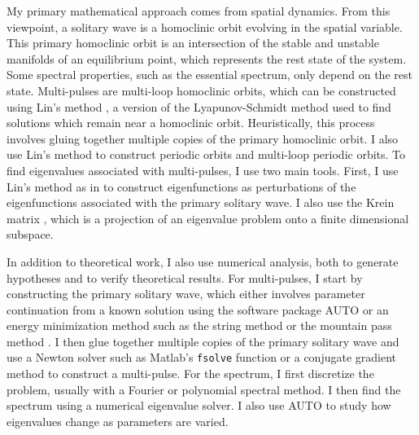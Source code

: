 \documentclass[12pt,reqno,oneside]{article}
\theoremstyle{definition}
\theoremstyle{remark}
\begin{document}
My primary mathematical approach comes from spatial dynamics. From this viewpoint, a solitary wave is a homoclinic orbit evolving in the spatial variable. This primary homoclinic orbit is an intersection of the stable and unstable manifolds of an equilibrium point, which represents the rest state of the system. Some spectral properties, such as the essential spectrum, only depend on the rest state. Multi-pulses are multi-loop homoclinic orbits, which can be constructed using Lin's method \cite{Lin2008}, a version of the Lyapunov-Schmidt method used to find solutions which remain near a homoclinic orbit. Heuristically, this process involves gluing together multiple copies of the primary homoclinic orbit. I also use Lin's method to construct periodic orbits and multi-loop periodic orbits. To find eigenvalues associated with multi-pulses, I use two main tools. First, I use Lin's method as in \cite{Sandstede1998} to construct eigenfunctions as perturbations of the eigenfunctions associated with the primary solitary wave. I also use the Krein matrix \cite{Kapitula2013a,Kapitula2020}, which is a projection of an eigenvalue problem onto a finite dimensional subspace.

In addition to theoretical work, I also use numerical analysis, both to generate hypotheses and to verify theoretical results. For multi-pulses, I start by constructing the primary solitary wave, which either involves parameter continuation from a known solution using the software package AUTO or an energy minimization method such as the string method \cite{Chamard2011} or the mountain pass method \cite{Chen1997}. I then glue together multiple copies of the primary solitary wave and use a Newton solver such as Matlab's \texttt{fsolve} function or a conjugate gradient method to construct a multi-pulse. For the spectrum, I first discretize the problem, usually with a Fourier or polynomial spectral method. I then find the spectrum using a numerical eigenvalue solver. I also use AUTO to study how eigenvalues change as parameters are varied.
\end{document}

